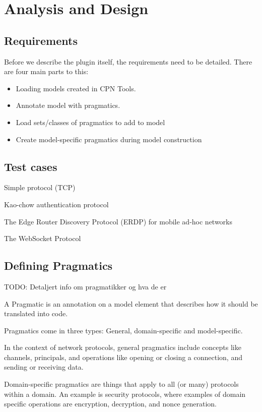 \chapter{Analysis and Design}
\label{chap:analysis}

\section{Requirements} 
Before we describe the plugin itself, the requirements need to be detailed.
There are four main parts to this:

\begin{itemize}
	\item Loading models created in CPN Tools.

	\item Annotate model with pragmatics. 
		
	\item Load sets/classes of pragmatics to add to model
	
	\item Create model-specific pragmatics during model construction

\end{itemize}

\section{Test cases}


Simple protocol (TCP)

Kao-chow authentication protocol

The Edge Router Discovery Protocol (ERDP) for mobile ad-hoc networks

The WebSocket Protocol

\section{Defining Pragmatics}
TODO: Detaljert info om pragmatikker og hva de er

A Pragmatic is an annotation on a model element that describes how it should be
translated into code.

Pragmatics come in three types: General, domain-specific and model-specific.

In the context of network protocols, general pragmatics include concepts
like channels, principals, and operations like opening or closing a connection,
and sending or receiving data. 

Domain-specific pragmatics are things that apply to all (or many) protocols
within a domain. An example is security protocols, where examples of domain
specific operations are encryption, decryption, and nonce generation.


